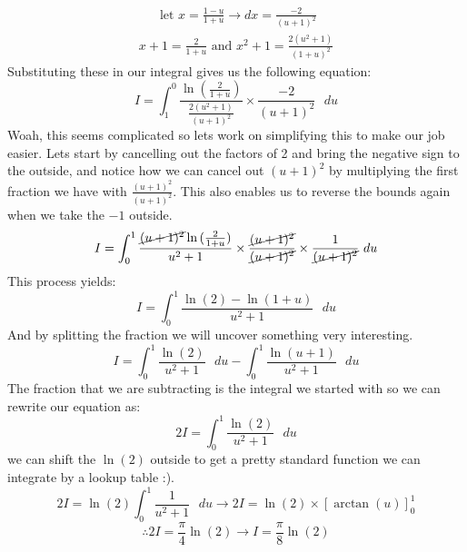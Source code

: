 \documentclass{article}
\begin{document}
\begin{eqnarray}
    \text{ let $x = \frac{1-u}{1+u}$} \to \text{$dx = \frac{-2}{(u+1)^{2}}$}\nonumber
\end{eqnarray}
\begin{eqnarray}
    x + 1 = \frac{2}{1+u}\text{ and }x^{2} + 1 = \frac{2(u^{2}+1)}{(1+u)^{2}}\nonumber
\end{eqnarray} 
Substituting these in our integral gives us the following equation:
\begin{equation}
    I =  \int_{1}^{0}\frac{\ln{(\frac{2}{1+u})}}{\frac{2(u^{2}+1)}{(u+1)^{2}}} \times\frac{-2}{(u+1)^{2}} \text{ $du$}\nonumber
\end{equation}
Woah, this seems complicated so lets work on simplifying this to make our job easier.
Lets start by cancelling out the factors of 2 and bring the negative sign to the outside, and notice how we can cancel out $(u+1)^{2}$ by multiplying the first fraction we have with $\frac{(u+1)^{2}}{(u+1)^{2}}$. This also enables us to reverse the bounds again when we take the $-1$ outside.
\begin{equation}
    I =  \int_{0}^{1}\frac{\cancel{(u+1)^{2}}\ln{(\frac{2}{1+u})}}{u^{2}+1}\times\frac{\cancel{(u+1)^{2}}}{\cancel{(u+1)^{2}}}\times\frac{1}{\cancel{(u+1)^{2}}} \text{ $du$} \nonumber   
\end{equation}
This process yields:
\begin{equation}
    I = \int_{0}^{1}\frac{\ln{(2)}-\ln{(1+u)}}{u^{2}+1} \text{ $du$}\nonumber
\end{equation}
And by splitting the fraction we will uncover something very interesting.
\begin{equation}
    I = \int_{0}^{1}\frac{\ln{(2)}}{u^{2}+1}\text{ $du$} - \int_{0}^{1}\frac{\ln{(u+1)}}{u^{2}+1}\text{ $du$}\nonumber
\end{equation}  
The fraction that we are subtracting is the integral we started with so we can rewrite our equation as:
\begin{equation}
2I = \int_{0}^{1}\frac{\ln{(2)}}{u^{2}+1}\text{ $du$} \nonumber  
\end{equation}
\newpage
we can shift the $\ln{(2)}$ outside to get a pretty standard function we can integrate by a lookup table :).
\begin{equation}
    2I = \ln{(2)}\int_{0}^{1}\frac{1}{u^{2}+1}\text{ $du$} \to 2I =  \ln{(2)} \times \left[ \arctan{(u)} \right]_{0}^{1} \nonumber
\end{equation}
\begin{equation}
    \therefore 2I = \frac{\pi}{4}\ln{(2)} \to I = \frac{\pi}{8}\ln{(2)}\nonumber
\end{equation}
\end{document}
